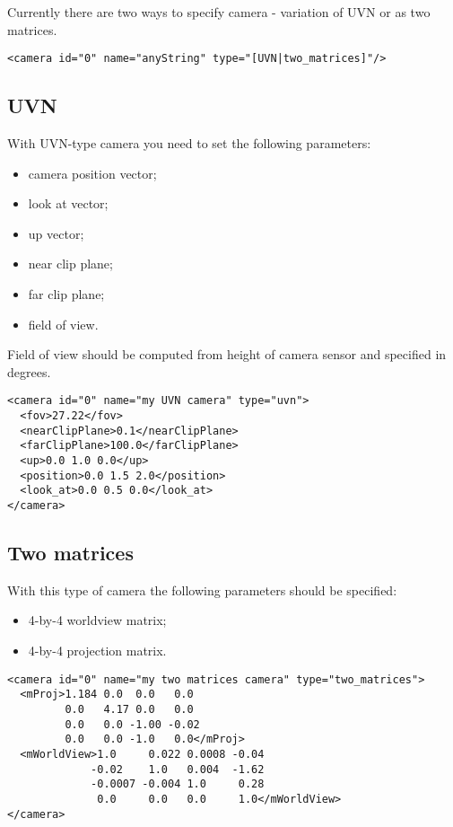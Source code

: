\documentclass[a4paper,11pt]{report}
\begin{document}
Currently there are two ways to specify camera - variation of UVN or as two matrices.

\begin{lstlisting}
<camera id="0" name="anyString" type="[UVN|two_matrices]"/>
\end{lstlisting}

\subsection{UVN}
With UVN-type camera you need to set the following parameters:
\begin{itemize}
\item camera position vector;
\item look at vector;
\item up vector;
\item near clip plane;
\item far clip plane;
\item field of view.
\end{itemize}

Field of view should be computed from height of camera sensor and specified in degrees.
 
\lstset{language=XML}
\begin{lstlisting}
<camera id="0" name="my UVN camera" type="uvn">
  <fov>27.22</fov>
  <nearClipPlane>0.1</nearClipPlane>
  <farClipPlane>100.0</farClipPlane>
  <up>0.0 1.0 0.0</up>
  <position>0.0 1.5 2.0</position>
  <look_at>0.0 0.5 0.0</look_at>
</camera>
\end{lstlisting}

\subsection{Two matrices}

With this type of camera the following parameters should be specified:
\begin{itemize}
\item 4-by-4 worldview matrix;
\item 4-by-4 projection matrix.
\end{itemize}

\lstset{language=XML}
\begin{lstlisting}
<camera id="0" name="my two matrices camera" type="two_matrices">
  <mProj>1.184 0.0  0.0   0.0
         0.0   4.17 0.0   0.0
         0.0   0.0 -1.00 -0.02
         0.0   0.0 -1.0   0.0</mProj>
  <mWorldView>1.0     0.022 0.0008 -0.04
             -0.02    1.0   0.004  -1.62
             -0.0007 -0.004 1.0     0.28
              0.0     0.0   0.0     1.0</mWorldView>
</camera>
\end{lstlisting}
\end{document}
